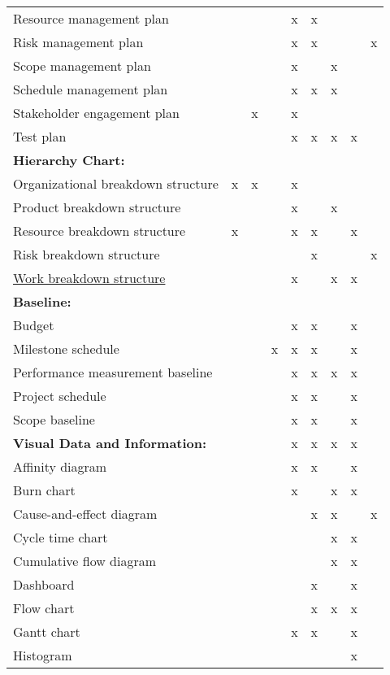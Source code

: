 \documentclass[11pt]{article}
\begin{document}
\begin{center}
\begin{tabular}{lllllllll}
Resource management plan &  &  &  & x & x &  &  & \\
Risk management plan &  &  &  & x & x &  &  & x\\
Scope management plan &  &  &  & x &  & x &  & \\
Schedule management plan &  &  &  & x & x & x &  & \\
Stakeholder engagement plan &  & x &  & x &  &  &  & \\
Test plan &  &  &  & x & x & x & x & \\
\hline
\textbf{Hierarchy Chart:} &  &  &  &  &  &  &  & \\
\hline
Organizational breakdown structure & x & x &  & x &  &  &  & \\
Product breakdown structure &  &  &  & x &  & x &  & \\
Resource breakdown structure & x &  &  & x & x &  & x & \\
Risk breakdown structure &  &  &  &  & x &  &  & x\\
\href{./Hierarchy\_chart/work\_breakdown\_structure.org}{Work breakdown structure} &  &  &  & x &  & x & x & \\
\hline
\textbf{Baseline:} &  &  &  &  &  &  &  & \\
\hline
Budget &  &  &  & x & x &  & x & \\
Milestone schedule &  &  & x & x & x &  & x & \\
Performance measurement baseline &  &  &  & x & x & x & x & \\
Project schedule &  &  &  & x & x &  & x & \\
Scope baseline &  &  &  & x & x &  & x & \\
\hline
\textbf{Visual Data and Information:} &  &  &  & x & x & x & x & \\
\hline
Affinity diagram &  &  &  & x & x &  & x & \\
Burn chart &  &  &  & x &  & x & x & \\
Cause-and-effect diagram &  &  &  &  & x & x &  & x\\
Cycle time chart &  &  &  &  &  & x & x & \\
Cumulative flow diagram &  &  &  &  &  & x & x & \\
Dashboard &  &  &  &  & x &  & x & \\
Flow chart &  &  &  &  & x & x & x & \\
Gantt chart &  &  &  & x & x &  & x & \\
Histogram &  &  &  &  &  &  & x & \\

\end{tabular}
\end{center}
\end{document}
